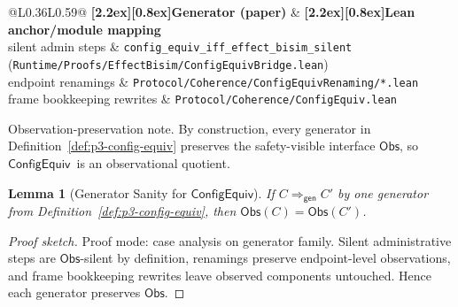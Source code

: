 \documentclass[a4paper,10pt,twocolumn,english]{article}
\numberwithin{equation}{section}
\theoremstyle{paperdef}
\theoremstyle{paperplain}
\newtheorem{lemma}[definition]{Lemma}
\theoremstyle{paperdef}
\theoremstyle{paperremark}
\theoremstyle{paperdef}
\newcommand{\thead}[1]{\textbf{\raisebox{0pt}[2.2ex][0.8ex]{#1}}}
\newcommand{\ConfigEquiv}{\ensuremath{\mathsf{ConfigEquiv}}}
\newcommand{\Obs}{\ensuremath{\mathsf{Obs}}}
\begin{document}
\begin{table}[H]
	\centering
	\footnotesize
	\begin{tabularx}{\columnwidth}{@{}L{0.36\columnwidth}L{0.59\columnwidth}@{}}
		\toprule
		\thead{Generator (paper)}  & \thead{Lean anchor/module mapping}                                                                            \\
		\midrule
		silent admin steps         & \nolinkurl{config_equiv_iff_effect_bisim_silent} (\texttt{Runtime/Proofs/EffectBisim/ConfigEquivBridge.lean}) \\
		endpoint renamings         & \texttt{Protocol/Coherence/ConfigEquivRenaming/*.lean}                                                        \\
		frame bookkeeping rewrites & \texttt{Protocol/Coherence/ConfigEquiv.lean}                                                                  \\
		\bottomrule
	\end{tabularx}
	\caption{Mapping from paper-level \ConfigEquiv\ generators to mechanized anchors/modules.}
	\label{tab:p3-config-equiv-map}
\end{table}

Observation-preservation note. By construction, every generator in
Definition~\ref{def:p3-config-equiv} preserves the safety-visible interface
$\Obs$, so \ConfigEquiv\ is an observational quotient.

\begin{lemma}[Generator Sanity for \ConfigEquiv]
	\label{lem:p3-config-equiv-generator-sanity}
	If $C \Rightarrow_{\mathsf{gen}} C'$ by one generator from
	Definition~\ref{def:p3-config-equiv}, then
	$\Obs(C)=\Obs(C')$.
\end{lemma}

\begin{proof}[Proof sketch]
	Proof mode: case analysis on generator family. Silent administrative steps are
	\Obs-silent by definition, renamings preserve endpoint-level observations, and
	frame bookkeeping rewrites leave observed components untouched. Hence each
	generator preserves \Obs.
\end{proof}
\end{document}
